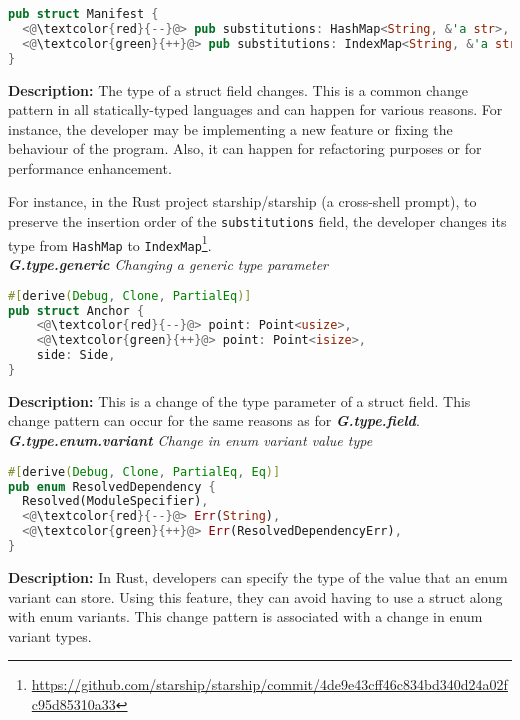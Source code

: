 \begin{lstlisting}[language=Rust, style=colouredRust]
pub struct Manifest {
  <@\textcolor{red}{--}@> pub substitutions: HashMap<String, &'a str>,
  <@\textcolor{green}{++}@> pub substitutions: IndexMap<String, &'a str>,
}

\end{lstlisting}

\noindent\textbf{Description:} The type of a struct field changes. This is a common change pattern in all statically-typed languages and can happen for various reasons. For instance, the developer may be implementing a new feature or fixing the behaviour of the program. Also, it can happen for refactoring purposes or for performance enhancement. 

For instance, in the Rust project starship/starship (a cross-shell prompt), to preserve the insertion order of the \verb+substitutions+ field, the developer changes its type from \verb+HashMap+ to \verb+IndexMap+\footnote{\url{https://github.com/starship/starship/commit/4de9e43cff46c834bd340d24a02fc95d85310a33}}.
\\

\noindent\textit{\textbf{G.type.generic} Changing a generic type parameter}

\begin{lstlisting}[language=Rust, style=colouredRust]
#[derive(Debug, Clone, PartialEq)]
pub struct Anchor {
    <@\textcolor{red}{--}@> point: Point<usize>,
    <@\textcolor{green}{++}@> point: Point<isize>,
    side: Side,
}

\end{lstlisting}

\noindent\textbf{Description:} This is a change of the type parameter of a struct field. This change pattern can occur for the same reasons as for \textit{\textbf{G.type.field}}. \\

\noindent\textit{\textbf{G.type.enum.variant} Change in enum variant value type}

\begin{lstlisting}[language=Rust, style=colouredRust]
#[derive(Debug, Clone, PartialEq, Eq)]
pub enum ResolvedDependency {
  Resolved(ModuleSpecifier),
  <@\textcolor{red}{--}@> Err(String),
  <@\textcolor{green}{++}@> Err(ResolvedDependencyErr),
}

\end{lstlisting}

\noindent\textbf{Description:} In Rust, developers can specify the type of the value that an enum variant can store. Using this feature, they can avoid having to use a struct along with enum variants. This change pattern is associated with a change in enum variant types. \\


